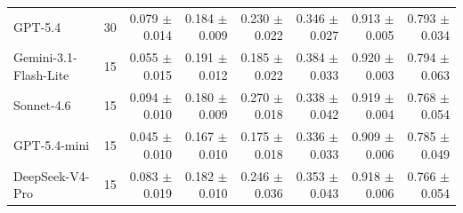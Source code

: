 \begin{table}[t]
\begin{tabular*}{\textwidth}{@{\extracolsep{\fill}}lrrrrrrr@{}}
GPT-5.4 & 30 & \shortstack[r]{0.079\\{\scriptsize $\pm$0.014}} & \shortstack[r]{0.184\\{\scriptsize $\pm$0.009}} & \shortstack[r]{0.230\\{\scriptsize $\pm$0.022}} & \shortstack[r]{0.346\\{\scriptsize $\pm$0.027}} & \shortstack[r]{0.913\\{\scriptsize $\pm$0.005}} & \shortstack[r]{0.793\\{\scriptsize $\pm$0.034}} \\
Gemini-3.1-Flash-Lite & 15 & \shortstack[r]{0.055\\{\scriptsize $\pm$0.015}} & \shortstack[r]{0.191\\{\scriptsize $\pm$0.012}} & \shortstack[r]{0.185\\{\scriptsize $\pm$0.022}} & \shortstack[r]{0.384\\{\scriptsize $\pm$0.033}} & \shortstack[r]{0.920\\{\scriptsize $\pm$0.003}} & \shortstack[r]{0.794\\{\scriptsize $\pm$0.063}} \\
Sonnet-4.6 & 15 & \shortstack[r]{0.094\\{\scriptsize $\pm$0.010}} & \shortstack[r]{0.180\\{\scriptsize $\pm$0.009}} & \shortstack[r]{0.270\\{\scriptsize $\pm$0.018}} & \shortstack[r]{0.338\\{\scriptsize $\pm$0.042}} & \shortstack[r]{0.919\\{\scriptsize $\pm$0.004}} & \shortstack[r]{0.768\\{\scriptsize $\pm$0.054}} \\
GPT-5.4-mini & 15 & \shortstack[r]{0.045\\{\scriptsize $\pm$0.010}} & \shortstack[r]{0.167\\{\scriptsize $\pm$0.010}} & \shortstack[r]{0.175\\{\scriptsize $\pm$0.018}} & \shortstack[r]{0.336\\{\scriptsize $\pm$0.033}} & \shortstack[r]{0.909\\{\scriptsize $\pm$0.006}} & \shortstack[r]{0.785\\{\scriptsize $\pm$0.049}} \\
DeepSeek-V4-Pro & 15 & \shortstack[r]{0.083\\{\scriptsize $\pm$0.019}} & \shortstack[r]{0.182\\{\scriptsize $\pm$0.010}} & \shortstack[r]{0.246\\{\scriptsize $\pm$0.036}} & \shortstack[r]{0.353\\{\scriptsize $\pm$0.043}} & \shortstack[r]{0.918\\{\scriptsize $\pm$0.006}} & \shortstack[r]{0.766\\{\scriptsize $\pm$0.054}} \\

\end{tabular*}
\end{table}
